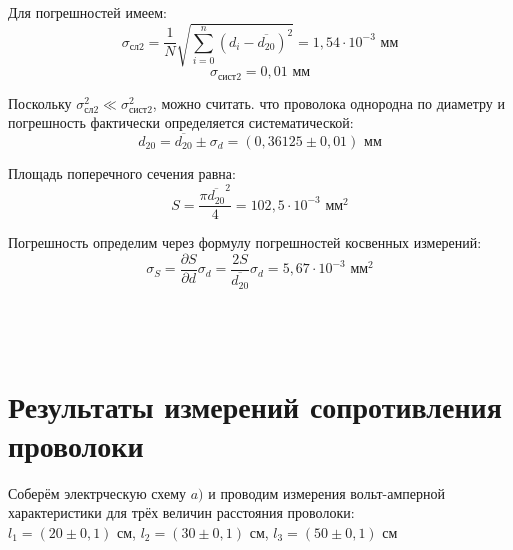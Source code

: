 \documentclass[a4paper, 12pt]{article} %
\begin{document}
Для погрешностей имеем:
\[\sigma_{\text{сл}2} = \frac{1}{N}\sqrt{\sum_{i = 0}^{n}{(d_i-\overline{d_{20}})^2}} = 1,54\cdot 10^{-3} \text{ мм}\] 
\[\sigma_{\text{сист}2} = 0,01 \text{ мм}\]

Поскольку $\sigma_{\text{сл}2}^2 \ll \sigma_{\text{сист}2}^2$, можно считать. что проволока однородна по диаметру и погрешность фактически определяется систематической:
\[d_{20} = \overline{d_{20}} \pm \sigma_d = (0,36125 \pm 0,01) \text{ мм}\]

Площадь поперечного сечения равна:
\[S = \frac{\pi \overline{d_{20}}^2}{4} = 102,5\cdot 10^{-3}\text{ мм}^{2}\]

Погрешность определим через формулу погрешностей косвенных измерений:
\[\sigma_S = \frac{\partial{S}}{\partial{d}}\sigma_d = \frac{2S}{\overline{d_{20}}}\sigma_d = 5,67\cdot 10^{-3}\text{ мм}^{2}\]\\\\\\

\section{Результаты измерений сопротивления проволоки}

Соберём электрческую схему $a)$ и проводим измерения вольт-амперной характеристики для трёх величин расстояния проволоки:\\ $l_1=(20\pm 0,1)$ см, $l_2=(30\pm 0,1)$ см, $l_3=(50\pm 0,1)$ см
\end{document}
